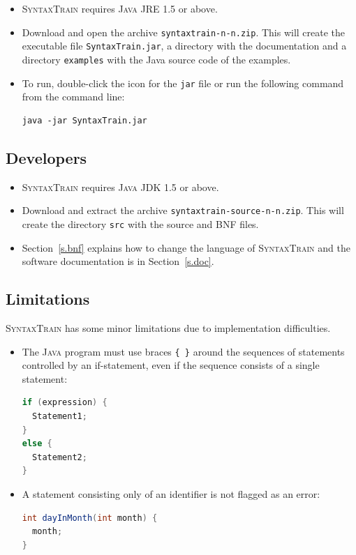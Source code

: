\documentclass[11pt]{article}
\newcommand*{\st}{\textsc{SyntaxTrain}}
\newcommand*{\jv}{\textsc{Java}}
\begin{document}
\begin{itemize}

\item \st{} requires \jv{} JRE 1.5 or above.

\item Download and open the archive \texttt{syntaxtrain-n-n.zip}. This
will create the executable file \texttt{SyntaxTrain.jar}, a directory
with the documentation and a directory \texttt{examples} with the Java
source code of the examples.

\item To run, double-click the icon for the \texttt{jar} file or run the
following command from the command line:
\begin{verbatim}
java -jar SyntaxTrain.jar
\end{verbatim}

\end{itemize}

\subsection*{Developers}

\begin{itemize}

\item \st{} requires \jv{} JDK 1.5 or above.

\item Download and extract the archive \texttt{syntaxtrain-source-n-n.zip}.
This will create the directory \texttt{src} with the
source and BNF files.

\item Section~\ref{s.bnf} explains how to change the language of \st{}
and the software documentation is in Section~\ref{s.doc}.

\end{itemize}

\subsection*{Limitations}

\st{} has some minor limitations due to implementation difficulties.

\begin{itemize}

\item The \jv{} program must use braces \verb+{ }+ around the sequences
of statements controlled by an if-statement, even if the sequence
consists of a single statement:

\begin{lstlisting}[language=Java]
if (expression) {
  Statement1;
}
else {
  Statement2;
}
\end{lstlisting}

\item A statement consisting only of an identifier is not flagged as an
error:
\begin{lstlisting}[language=Java]
int dayInMonth(int month) {
  month;
}
\end{lstlisting}

\end{itemize}
\end{document}
